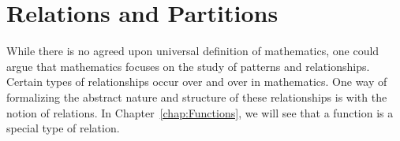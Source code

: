 \chapter{Relations and Partitions}\label{chap:Relations Partitions}


While there is no agreed upon universal definition of mathematics, one could argue that mathematics focuses on the study of patterns and relationships. Certain types of relationships occur over and over in mathematics.  One way of formalizing the abstract nature and structure of these relationships is with the notion of relations. In Chapter~\ref{chap:Functions}, we will see that a function is a special type of relation.